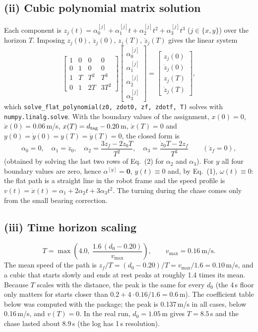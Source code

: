 \documentclass[11pt,a4paper]{article}
\begin{document}
\subsection{(ii) Cubic polynomial matrix solution}
Each component is $z_j(t)=\alpha_0^{[j]}+\alpha_1^{[j]}t+\alpha_2^{[j]}t^2+\alpha_3^{[j]}t^3$ ($j\in\{x,y\}$) over the horizon $T$. Imposing $z_j(0)$, $\dot z_j(0)$, $z_j(T)$, $\dot z_j(T)$ gives the linear system
\begin{equation}
\begin{bmatrix}1&0&0&0\\0&1&0&0\\1&T&T^2&T^3\\0&1&2T&3T^2\end{bmatrix}
\begin{bmatrix}\alpha_0^{[j]}\\\alpha_1^{[j]}\\\alpha_2^{[j]}\\\alpha_3^{[j]}\end{bmatrix}
=\begin{bmatrix}z_j(0)\\\dot z_j(0)\\z_j(T)\\\dot z_j(T)\end{bmatrix},\tag{2}
\end{equation}
which \texttt{solve\_flat\_polynomial(z0, zdot0, zf, zdotf, T)} solves with \texttt{numpy.linalg.solve}. With the boundary values of the assignment, $x(0)=0$, $\dot x(0)=0.06$\,m/s, $x(T)=d_{\rm tag}-0.20$\,m, $\dot x(T)=0$ and $y(0)=\dot y(0)=y(T)=\dot y(T)=0$, the closed form is
\[
\alpha_0=0,\quad \alpha_1=\dot z_0,\quad
\alpha_2=\frac{3z_f-2\dot z_0T}{T^2},\quad
\alpha_3=\frac{\dot z_0T-2z_f}{T^3}\qquad(\dot z_f=0),
\]
(obtained by solving the last two rows of Eq.~(2) for $\alpha_2$ and $\alpha_3$). For $y$ all four boundary values are zero, hence $\alpha^{[y]}=\mathbf 0$, $y(t)\equiv0$ and, by Eq.~(1), $\omega(t)\equiv0$: the flat path is a straight line in the robot frame and the speed profile is $v(t)=\dot x(t)=\alpha_1+2\alpha_2t+3\alpha_3t^2$. The turning during the chase comes only from the small bearing correction.

\subsection{(iii) Time horizon scaling}
\begin{equation}
T=\max\!\left(4.0,\ \frac{1.6\,(d_0-0.20)}{v_{\max}}\right),\qquad v_{\max}=0.16\ \text{m/s}.\tag{3}
\end{equation}
The mean speed of the path is $z_f/T=(d_0-0.20)/T=v_{\max}/1.6=0.10$\,m/s, and a cubic that starts slowly and ends at rest peaks at roughly 1.4 times its mean. Because $T$ scales with the distance, the peak is the same for every $d_0$ (the 4\,s floor only matters for starts closer than $0.2+4\cdot0.16/1.6=0.6$\,m). The coefficient table below was computed with the package; the peak is 0.137\,m/s in all cases, below 0.16\,m/s, and $v(T)=0$. In the real run, $d_0=1.05$\,m gives $T=8.5$\,s and the chase lasted about 8.9\,s (the log has 1\,s resolution).
\end{document}
